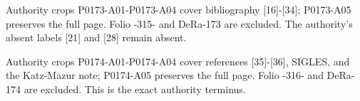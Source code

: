 \documentclass[11pt,a4paper]{article}
\begin{document}
\par\medskip
\hypertarget{D018-P0173}{}
\par\smallskip
Authority crops P0173-A01-P0173-A04 cover bibliography [16]-[34]; P0173-A05 preserves the full page. Folio -315- and DeRa-173 are excluded. The authority's absent labels [21] and [28] remain absent.


\par\medskip
\hypertarget{D018-P0174}{}
\par\smallskip
Authority crops P0174-A01-P0174-A04 cover references [35]-[36], SIGLES, and the Katz-Mazur note; P0174-A05 preserves the full page. Folio -316- and DeRa-174 are excluded. This is the exact authority terminus.


\par\medskip
\end{document}
